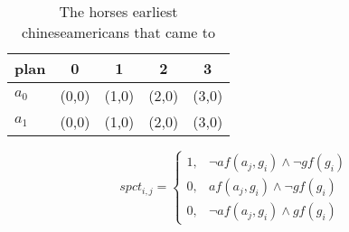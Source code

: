 \documentclass[a4paper]{article}
\begin{document}
\begin{table}
\begin{adjustbox}{width=0.8\columnwidth}
\begin{tabular}{|l|l|l|l|l|}
\hline
\textbf{plan} & \multicolumn{1}{c|}{\textbf{0}} & \multicolumn{1}{c|}{\textbf{1}} & \multicolumn{1}{c|}{\textbf{2}} & \multicolumn{1}{c|}{\textbf{3}} \\ \hline
\textbf{$a_0$}  & (0,0) & (1,0) & (2,0) & (3,0) \\ \hline
\textbf{$a_1$}  & (0,0) & (1,0) & (2,0) & (3,0) \\ \hline
\end{tabular}
\end{adjustbox}
\caption{The horses earliest chineseamericans that came to
}
\end{table}

\begin{equation}
spct_{i,j} =
\begin{cases}
1, & \text{$\neg af(a_j,g_i) \wedge \neg gf(g_i)$}\\
0, & \text{$af(a_j,g_i) \wedge \neg gf(g_i)$}\\
0, & \text{$\neg af(a_j,g_i) \wedge gf(g_i)$}
\end{cases}
\end{equation}
\end{document}
